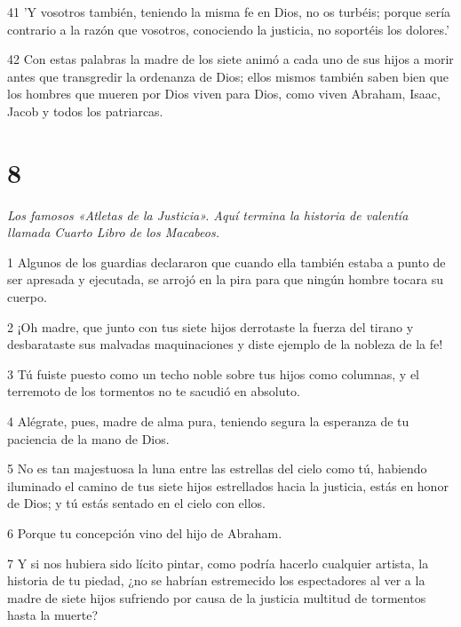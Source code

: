 \par 41 'Y vosotros también, teniendo la misma fe en Dios, no os turbéis; porque sería contrario a la razón que vosotros, conociendo la justicia, no soportéis los dolores.'

\par 42 Con estas palabras la madre de los siete animó a cada uno de sus hijos a morir antes que transgredir la ordenanza de Dios; ellos mismos también saben bien que los hombres que mueren por Dios viven para Dios, como viven Abraham, Isaac, Jacob y todos los patriarcas.



\chapter{8}

\par \textit{Los famosos «Atletas de la Justicia». Aquí termina la historia de valentía llamada Cuarto Libro de los Macabeos.}

\par 1 Algunos de los guardias declararon que cuando ella también estaba a punto de ser apresada y ejecutada, se arrojó en la pira para que ningún hombre tocara su cuerpo.

\par 2 ¡Oh madre, que junto con tus siete hijos derrotaste la fuerza del tirano y desbarataste sus malvadas maquinaciones y diste ejemplo de la nobleza de la fe!

\par 3 Tú fuiste puesto como un techo noble sobre tus hijos como columnas, y el terremoto de los tormentos no te sacudió en absoluto.

\par 4 Alégrate, pues, madre de alma pura, teniendo segura la esperanza de tu paciencia de la mano de Dios.

\par 5 No es tan majestuosa la luna entre las estrellas del cielo como tú, habiendo iluminado el camino de tus siete hijos estrellados hacia la justicia, estás en honor de Dios; y tú estás sentado en el cielo con ellos.

\par 6 Porque tu concepción vino del hijo de Abraham.

\par 7 Y si nos hubiera sido lícito pintar, como podría hacerlo cualquier artista, la historia de tu piedad, ¿no se habrían estremecido los espectadores al ver a la madre de siete hijos sufriendo por causa de la justicia multitud de tormentos hasta la muerte?

